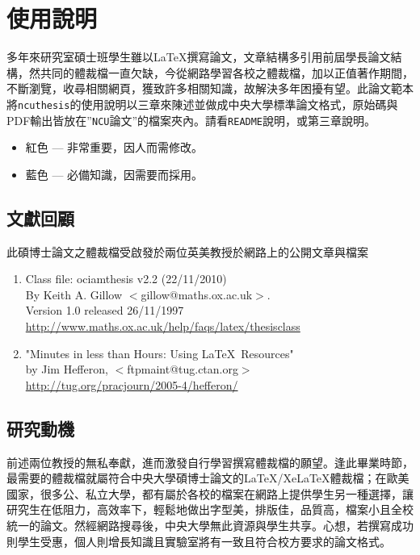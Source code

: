 \chapter{使用說明}
多年來研究室碩士班學生雖以\LaTeX 撰寫論文，文章結構多引用前屆學長論文結構，然共同的體裁檔一直欠缺，今從網路學習各校之體裁檔，加以正值著作期間，不斷瀏覽，收尋相關網頁，獲致許多相關知識，故解決多年困擾有望。此論文範本將{\tt ncuthesis}的使用說明以三章來陳述並做成中央大學標準論文格式，原始碼與PDF輸出皆放在''{\tt NCU}論文''的檔案夾內。請看{\tt README}說明，或第三章說明。
\begin{itemize}
\item {\color{red}紅色} ---  非常重要，因人而需修改。
\item {\color{blue}藍色} --- 必備知識，因需要而採用。
\end{itemize}
\section{文獻回顧}
此碩博士論文之體裁檔受啟發於兩位英美教授於網路上的公開文章與檔案
\begin{enumerate}
\item Class file: ociamthesis v2.2 (22/11/2010) \\
    By Keith A. Gillow $<$gillow@maths.ox.ac.uk$>$. \\
    Version 1.0 released 26/11/1997\\
	\url{http://www.maths.ox.ac.uk/help/faqs/latex/thesisclass}
\item "Minutes in less than Hours: Using \LaTeX\ Resources" \\
    by Jim Hefferon, $<$ftpmaint@tug.ctan.org$>$\\
	\url{http://tug.org/pracjourn/2005-4/hefferon/}
\end{enumerate}
\section{研究動機}
前述兩位教授的無私奉獻，進而激發自行學習撰寫體裁檔的願望。逢此畢業時節，最需要的體裁檔就屬符合中央大學碩博士論文的\LaTeX{}/Xe\LaTeX{}體裁檔；在歐美國家，很多公、私立大學，都有屬於各校的檔案在網路上提供學生另一種選擇，讓研究生在低阻力，高效率下，輕鬆地做出字型美，排版佳，品質高，檔案小且全校統一的論文。然經網路搜尋後，中央大學無此資源與學生共享。心想，若撰寫成功則學生受惠，個人則增長知識且實驗室將有一致且符合校方要求的論文格式。

